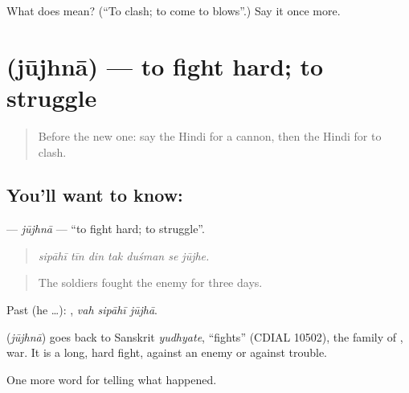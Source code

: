 \begin{tcolorbox}[breakable,colback=teal!4,colframe=teal!35!black,title={Before you move on}]
What does  mean? (\textquotedblleft{}To clash; to come to blows\textquotedblright{}.) Say it once more.
\end{tcolorbox}
\section[\texorpdfstring{\hi{जूझना} (jūjhnā)}{जूझना (jūjhnā)}]{ (jūjhnā) — to fight hard; to struggle}

\label{lesson:HI-C321-jujhna}



\begin{quote}
Before the new one: say the Hindi for a cannon, then the Hindi for to clash.
\end{quote}

\subsection*{You'll want to know: }
\textbf{} — \emph{jūjhnā} — \textquotedblleft{}to fight hard; to struggle\textquotedblright{}.

\begin{quote}
      
\end{quote}

\begin{quote}
\emph{sipāhī tīn din tak duśman se jūjhe.}
\end{quote}

\begin{quote}
The soldiers fought the enemy for three days.
\end{quote}

Past (he …):   , \emph{vah sipāhī jūjhā}.

\begin{cousinweb}
\textbf{} (\emph{jūjhnā}) goes back to Sanskrit \emph{yudhyate}, \textquotedblleft{}fights\textquotedblright{} (CDIAL 10502), the family of \textbf{}, war. It is a long, hard fight, against an enemy or against trouble.
\end{cousinweb}

\begin{grammarlens}[title={What you've built}]
One more word for telling what happened.
\end{grammarlens}

